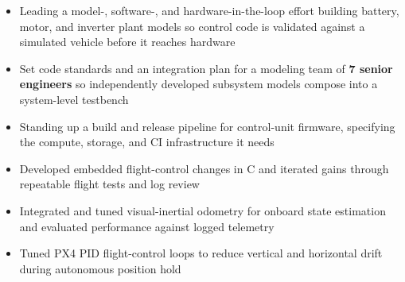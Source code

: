 \documentclass[10pt,letterpaper]{article}
\begin{document}
\bodyfont

\resumeheader
\educationsection




\orgline{\spartanracing}
\begin{itemize}
  \item Leading a model-, software-, and hardware-in-the-loop effort building battery, motor, and inverter plant models so control code is validated against a simulated vehicle before it reaches hardware
  \item Set code standards and an integration plan for a modeling team of \textbf{7 senior engineers} so independently developed subsystem models compose into a system-level testbench
  \item Standing up a build and release pipeline for control-unit firmware, specifying the compute, storage, and CI infrastructure it needs
\end{itemize}

\entryspace

\begin{itemize}
  \item Developed embedded flight-control changes in C and iterated gains through repeatable flight tests and log review
  \item Integrated and tuned visual-inertial odometry for onboard state estimation and evaluated performance against logged telemetry
  \item Tuned PX4 PID flight-control loops to reduce vertical and horizontal drift during autonomous position hold
\end{itemize}

\entryspace
\end{document}
